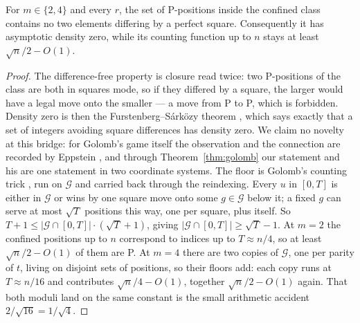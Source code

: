 \begin{corollary}\label{cor:sparse}
For $m \in \{2, 4\}$ and every $r$, the set of P-positions inside the
confined class contains no two elements differing by a perfect square.
Consequently it has asymptotic density zero, while its counting function
up to $n$ stays at least $\sqrt{n}/2 - O(1)$.
\end{corollary}
\begin{proof}
The difference-free property is closure read twice: two P-positions of
the class are both in squares mode, so if they differed by a square, the
larger would have a legal move onto the smaller --- a move from P to P,
which is forbidden. Density zero is then the Furstenberg--S\'ark\"ozy
theorem \cite{furstenberg, sarkozy}, which says exactly that a set of
integers avoiding square differences has density zero. We claim no
novelty at this bridge: for Golomb's game itself the observation and the
connection are recorded by Eppstein \cite{eppstein}, and through
Theorem~\ref{thm:golomb} our statement and his are one statement in two
coordinate systems.
The floor is Golomb's counting trick \cite{golomb, ruzsa}, run on $\mathcal{G}$
and carried back through the reindexing. Every $u$ in $[0, T]$ is either
in $\mathcal{G}$ or wins by one square move onto some $g \in \mathcal{G}$ below it; a fixed
$g$ can serve at most $\sqrt{T}$ positions this way, one per square,
plus itself. So $T + 1 \le |\mathcal{G} \cap [0, T]| \cdot (\sqrt{T} + 1)$, giving
$|\mathcal{G} \cap [0, T]| \ge \sqrt{T} - 1$. At $m = 2$ the confined positions up
to $n$ correspond to indices up to $T \approx n/4$, so at least
$\sqrt{n}/2 - O(1)$ of them are P. At $m = 4$ there are two copies of
$\mathcal{G}$, one per parity of $t$, living on disjoint sets of positions, so
their floors add: each copy runs at $T \approx n/16$ and contributes
$\sqrt{n}/4 - O(1)$, together $\sqrt{n}/2 - O(1)$ again. That both
moduli land on the same constant is the small arithmetic accident
$2/\sqrt{16} = 1/\sqrt{4}$.
\end{proof}

